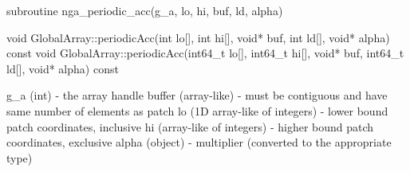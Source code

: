 \documentclass[12pt]{article}
\begin{document}
\begin{fapi}
\begin{fcode}
subroutine nga_periodic_acc(g_a, lo, hi, buf, ld, alpha)
\end{fcode}
\begin{funcargs}
\end{funcargs}
\end{fapi}

\begin{cxxapi}
\begin{cxxcode}
void GlobalArray::periodicAcc(int lo[], int hi[], void* buf,
                              int ld[], void* alpha) const
void GlobalArray::periodicAcc(int64_t lo[], int64_t hi[], void* buf,
                              int64_t ld[], void* alpha) const
\end{cxxcode}
\begin{funcargs}
\end{funcargs}
\end{cxxapi}

\begin{pyapi}
\begin{pycode}
   g_a (int)                      - the array handle
   buffer (array-like)            - must be contiguous and have same 
                                    number of elements as patch
   lo (1D array-like of integers) - lower bound patch coordinates, inclusive
   hi (array-like of integers)    - higher bound patch coordinates, exclusive
   alpha (object)                 - multiplier (converted to the
                                    appropriate type)
\end{pycode}
\end{pyapi}
\ncoll
\end{document}
